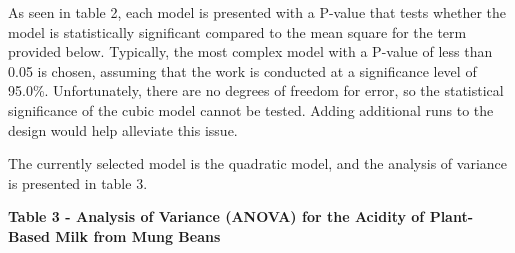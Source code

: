 
As seen in table 2, each model is presented with a P-value that tests
whether the model is statistically significant compared to the mean
square for the term provided below. Typically, the most complex model
with a P-value of less than 0.05 is chosen, assuming that the work is
conducted at a significance level of 95.0\%. Unfortunately, there are no
degrees of freedom for error, so the statistical significance of the
cubic model cannot be tested. Adding additional runs to the design would
help alleviate this issue.

The currently selected model is the quadratic model, and the analysis of
variance is presented in table 3.

{\bfseries Table 3 - Analysis of Variance (ANOVA) for the Acidity of
Plant-Based Milk from Mung Beans}

